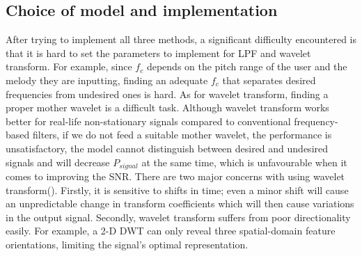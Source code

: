 \subsection{Choice of model and implementation}
After trying to implement all three methods, a significant difficulty encountered is that it is hard to set the parameters to 
implement for LPF and wavelet transform.
For example, since $f_c$ depends on the pitch range of the user and the melody they are inputting, finding an adequate $f_c$ that separates desired frequencies from undesired ones is hard.
As for wavelet transform, finding a proper mother wavelet is a difficult task.
Although wavelet transform works better for real-life non-stationary signals compared to conventional frequency-based filters, if we
do not feed a suitable mother wavelet, the performance is unsatisfactory, the model cannot distinguish between desired and undesired 
signals and will decrease $P_{signal}$ at the same time, which is unfavourable when it comes to improving the SNR.
There are two major concerns with using wavelet transform(\cite{complexwt}). 
Firstly, it is sensitive to shifts in time; even a minor shift will cause an unpredictable change in transform coefficients which will 
then cause variations in the output signal. Secondly, wavelet transform suffers from poor directionality easily. For example, 
a 2-D DWT can only reveal three spatial-domain feature orientations, limiting the signal's optimal representation. 

